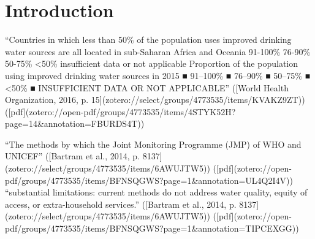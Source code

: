 
\chapter{Introduction} %

\label{Chapter1} %

\newcommand{\keyword}[1]{\textbf{#1}}
\newcommand{\tabhead}[1]{\textbf{#1}}
\newcommand{\code}[1]{\texttt{#1}}
\newcommand{\file}[1]{\texttt{\bfseries#1}}
\newcommand{\option}[1]{\texttt{\itshape#1}}




“Countries in which less than 50\% of the population uses improved drinking water sources are all located in sub-Saharan Africa and Oceania 91-100\% 76-90\% 50-75\% <50\% insufficient data or not applicable Proportion of the population using improved drinking water sources in 2015 ■ 91–100\% ■ 76–90\% ■ 50–75\% ■ <50\% ■ INSUFFICIENT DATA OR NOT APPLICABLE” ([World Health Organization, 2016, p. 15](zotero://select/groups/4773535/items/KVAKZ9ZT)) ([pdf](zotero://open-pdf/groups/4773535/items/4STYK52H?page=14\&annotation=FBURDS4T))

“The methods by which the Joint Monitoring Programme (JMP) of WHO and UNICEF” ([Bartram et al., 2014, p. 8137](zotero://select/groups/4773535/items/6AWUJTW5)) ([pdf](zotero://open-pdf/groups/4773535/items/BFNSQGWS?page=1&annotation=UL4Q2I4V))
“substantial limitations: current methods do not address water quality, equity of access, or extra-household services.” ([Bartram et al., 2014, p. 8137](zotero://select/groups/4773535/items/6AWUJTW5)) ([pdf](zotero://open-pdf/groups/4773535/items/BFNSQGWS?page=1&annotation=TIPCEXGG))



